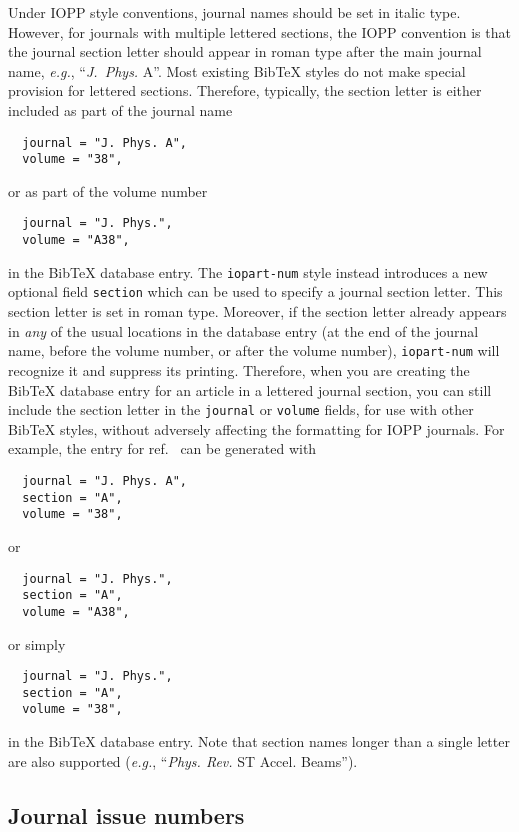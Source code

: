\documentclass[12pt]{iopart}
\newcommand{\BibTeX}{Bib\TeX}
\begin{document}
Under IOPP style conventions, journal names should be set in italic
type.  However, for journals with multiple lettered sections, the IOPP
convention is that the journal section letter should appear in roman
type after the main journal name, \textit{e.g.}, ``\textit{J.\
Phys.\/} A''.  Most existing \BibTeX{} styles do not make special
provision for lettered sections.  Therefore, typically, the section
letter is either included as part of the journal name
\begin{verbatim}
  journal = "J. Phys. A",
  volume = "38",
\end{verbatim}
or as part of the volume number
\begin{verbatim}
  journal = "J. Phys.",
  volume = "A38",
\end{verbatim}
in the \BibTeX{} database entry.  The \texttt{iopart-num} style
instead introduces a new optional field \verb+section+ which can be
used to specify a journal section letter.  This section letter is set in
roman type.  Moreover, if the section letter already appears in
\textit{any} of the usual locations in the database entry (at the end
of the journal name, before the volume number, or after the volume
number),
\texttt{iopart-num} will recognize it and suppress its printing.
Therefore, when you are creating the
\BibTeX{} database entry for an article in a lettered journal section,
you can still include the section letter in the \verb+journal+ or
\verb+volume+ fields, for use with other \BibTeX{} styles, 
without adversely affecting the formatting for IOPP journals.  For
example, the entry for ref.~\cite{caprio2005:coherent} can be
generated with
\begin{verbatim}
  journal = "J. Phys. A",
  section = "A",
  volume = "38",
\end{verbatim}
or
\begin{verbatim}
  journal = "J. Phys.",
  section = "A",
  volume = "A38",
\end{verbatim}
or simply
\begin{verbatim}
  journal = "J. Phys.",
  section = "A",
  volume = "38",
\end{verbatim}
in the \BibTeX{} database entry.  Note that section names longer than a
single letter are also supported (\textit{e.g.},
``\textit{Phys. Rev.\/} ST Accel. Beams'').

\subsection{Journal issue numbers}
\end{document}
